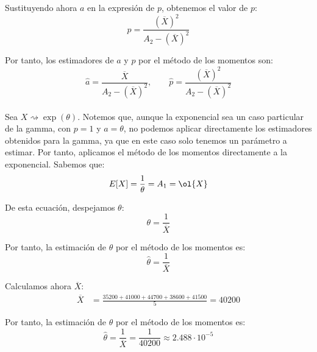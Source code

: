 \begin{ejercicio}
    Sustituyendo ahora $a$ en la expresión de $p$, obtenemos el valor de $p$:
    \begin{equation*}
        p = \frac{{\left(\overline{X}\right)}^{2}}{A_2-{\left(\overline{X}\right)}^{2}}
    \end{equation*}

    Por tanto, los estimadores de $a$ y $p$ por el método de los momentos son:
    \begin{equation*}
        \widehat{a} = \frac{\overline{X}}{A_2-{\left(\overline{X}\right)}^2}, \qquad \widehat{p} = \frac{{\left(\overline{X}\right)}^{2}}{A_2-{\left(\overline{X}\right)}^{2}}
    \end{equation*}~\\

    \noindent
    Sea $X\rightsquigarrow \exp(\theta)$. Notemos que, aunque la exponencial sea un caso particular de la gamma, con $p=1$ y $a=\theta$, no podemos aplicar directamente los estimadores obtenidos para la gamma, ya que en este caso solo tenemos un parámetro a estimar. Por tanto, aplicamos el método de los momentos directamente a la exponencial. Sabemos que:
    \begin{equation*}
        E[X] = \frac{1}{\theta} = A_1 = \ol{X}
    \end{equation*}

    De esta ecuación, despejamos $\theta$:
    \begin{equation*}
        \theta = \frac{1}{\overline{X}}
    \end{equation*}

    Por tanto, la estimación de $\theta$ por el método de los momentos es:
    \begin{equation*}
        \widehat{\theta} = \frac{1}{\overline{X}}
    \end{equation*}

    Calculamos ahora $\overline{X}$:
    \begin{align*}
        \overline{X} &= \frac{35200 + 41000 + 44700 + 38600 + 41500}{5} = 40200
    \end{align*}

    Por tanto, la estimación de $\theta$ por el método de los momentos es:
    \begin{equation*}
        \widehat{\theta} = \frac{1}{\overline{X}} = \frac{1}{40200} \approx 2.488\cdot 10^{-5}
    \end{equation*}

\end{ejercicio}
